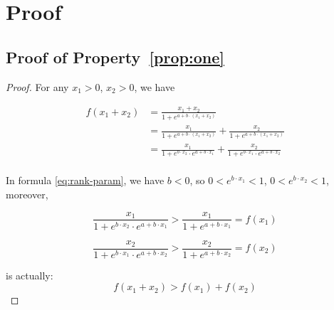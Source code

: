 \section{Proof}
\label{sec:appendix_proof}
\subsection{Proof of Property~\ref{prop:one}}
\begin{proof}
\label{proof:one}
For any $x_1>0$, $x_2>0$, we have

\[
\begin{aligned}
f(x_1+x_2)&=\frac{x_1+x_2}{1+e^{a+b\cdot (x_1+x_2)}}\\
&=\frac{x_1}{1+e^{a+b\cdot (x_1+x_2)}}+\frac{x_2}{1+e^{a+b\cdot (x_1+x_2)}}\\
&=\frac{x_1}{1+e^{b\cdot x_2}\cdot e^{a+b\cdot {x_1}}}+\frac{x_2}{1+e^{b\cdot x_1}\cdot e^{a+b\cdot {x_2}}}\\
\end{aligned}
\]

In formula \ref{eq:rank-param}, we have $b<0$, so $0<e^{b\cdot x_1}<1$, $0<e^{b\cdot x_2}<1$, moreover,

\[
\frac{x_1}{1+e^{b\cdot x_2}\cdot e^{a+b\cdot {x_1}}}>\frac{x_1}{1+ e^{a+b\cdot {x_1}}}=f(x_1)
\]

\[
\frac{x_2}{1+e^{b\cdot x_1}\cdot e^{a+b\cdot {x_2}}}>\frac{x_2}{1+ e^{a+b\cdot {x_2}}}=f(x_2)
\]

is actually:
\[
f(x_1+x_2)>f(x_1)+f(x_2)
\]
\end{proof}

